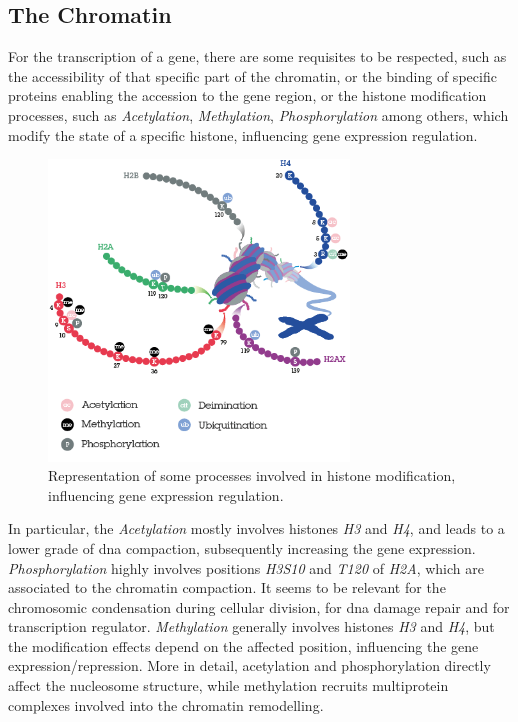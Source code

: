 \subsection{The Chromatin}
\label{sec:chromatin}

For the transcription of a gene, there are some requisites to be respected, such as the accessibility of that specific part of the chromatin, or the binding of specific proteins enabling the accession to the gene region, or the histone modification processes, such as \textit{Acetylation}, \textit{Methylation}, \textit{Phosphorylation} among others, which modify the state of a specific histone, influencing gene expression regulation. 

\begin{figure}[h]
\centering
\includegraphics[width=8cm, keepaspectratio]{img/intro/hm.png}
\caption[Histon modification]{Representation of some processes involved in histone modification, influencing gene expression regulation.}
\label{fig:histmod}
\end{figure}


In particular, the \textit{Acetylation} mostly involves histones \textit{H3} and \textit{H4}, and leads to a lower grade of \gls{dna} compaction, subsequently increasing the gene expression.
\textit{Phosphorylation} highly involves positions \textit{H3S10} and \textit{T120} of \textit{H2A}, which are associated to the chromatin compaction.
It seems to be relevant for the chromosomic condensation during cellular division, for \gls{dna} damage repair and for transcription regulator.
\textit{Methylation} generally involves histones \textit{H3} and \textit{H4}, but the modification effects depend on the affected position, influencing the gene expression/repression.
More in detail, acetylation and phosphorylation directly affect the nucleosome structure, while methylation recruits multiprotein complexes involved into the chromatin remodelling.

